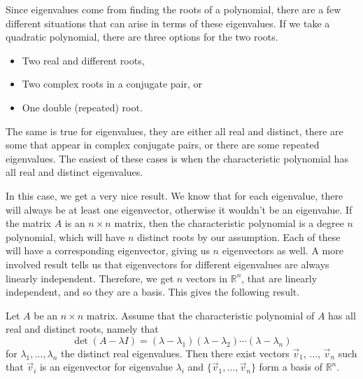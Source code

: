 \documentclass{ximera}
\begin{document}
Since eigenvalues come from finding the roots of a polynomial, there are a few different situations that can arise in terms of these eigenvalues. If we take a quadratic polynomial, there are three options for the two roots. 
\begin{itemize}
    \item Two real and different roots,
    \item Two complex roots in a conjugate pair, or
    \item One double (repeated) root.
\end{itemize}

The same is true for eigenvalues, they are either all real and distinct, there are some that appear in complex conjugate pairs, or there are some repeated eigenvalues. The easiest of these cases is when the characteristic polynomial has all real and distinct eigenvalues.

In this case, we get a very nice result. We know that for each eigenvalue, there will always be at least one eigenvector, otherwise it wouldn't be an eigenvalue. If the matrix $A$ is an $n \times n$ matrix, then the characteristic polynomial is a degree $n$ polynomial, which will have $n$ distinct roots by our assumption. Each of these will have a corresponding eigenvector, giving us $n$ eigenvectors as well. A more involved result tells us that eigenvectors for different eigenvalues are always linearly independent. Therefore, we get $n$ vectors in $\mathbb{R}^n$, that are linearly independent, and so they are a basis. This gives the following result.

\begin{theorem}{}
    Let $A$ be an $n \times n$ matrix. Assume that the characteristic polynomial of $A$ has all real and distinct roots, namely that
    \[ 
        \det(A - \lambda I) = (\lambda - \lambda_1)(\lambda - \lambda_2) \cdots (\lambda - \lambda_n) 
    \] 
    for $\lambda_1, ..., \lambda_n$ the distinct real eigenvalues. Then there exist vectors $\vec{v}_1$, ..., $\vec{v}_n$ such that $\vec{v}_i$ is an eigenvector for eigenvalue $\lambda_i$ and $\{\vec{v}_1, ..., \vec{v}_n\}$ form a basis of $\mathbb{R}^n$. 
\end{theorem}
\end{document}
